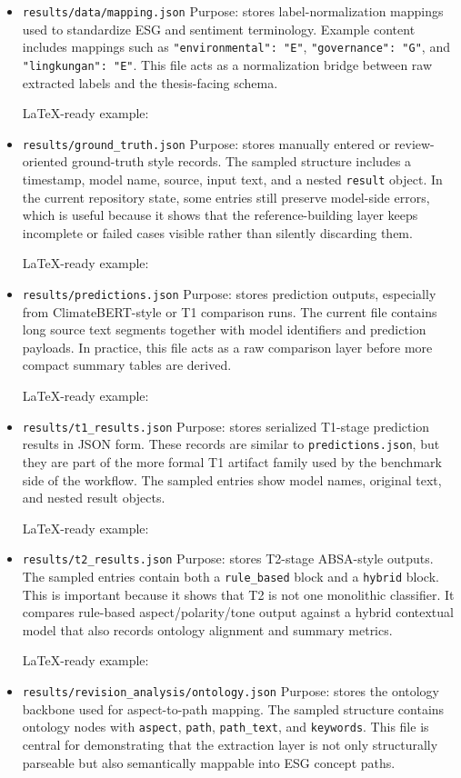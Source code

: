 \begin{itemize}
\item
  \texttt{results/data/mapping.json} Purpose: stores label-normalization mappings used to standardize ESG and sentiment terminology. Example content includes mappings such as \texttt{"environmental":\ "E"}, \texttt{"governance":\ "G"}, and \texttt{"lingkungan":\ "E"}. This file acts as a normalization bridge between raw extracted labels and the thesis-facing schema.

  LaTeX-ready example:
\item
  \texttt{results/ground\_truth.json} Purpose: stores manually entered or review-oriented ground-truth style records. The sampled structure includes a timestamp, model name, source, input text, and a nested \texttt{result} object. In the current repository state, some entries still preserve model-side errors, which is useful because it shows that the reference-building layer keeps incomplete or failed cases visible rather than silently discarding them.

  LaTeX-ready example:
\item
  \texttt{results/predictions.json} Purpose: stores prediction outputs, especially from ClimateBERT-style or T1 comparison runs. The current file contains long source text segments together with model identifiers and prediction payloads. In practice, this file acts as a raw comparison layer before more compact summary tables are derived.

  LaTeX-ready example:
\item
  \texttt{results/t1\_results.json} Purpose: stores serialized T1-stage prediction results in JSON form. These records are similar to \texttt{predictions.json}, but they are part of the more formal T1 artifact family used by the benchmark side of the workflow. The sampled entries show model names, original text, and nested result objects.

  LaTeX-ready example:
\item
  \texttt{results/t2\_results.json} Purpose: stores T2-stage ABSA-style outputs. The sampled entries contain both a \texttt{rule\_based} block and a \texttt{hybrid} block. This is important because it shows that T2 is not one monolithic classifier. It compares rule-based aspect/polarity/tone output against a hybrid contextual model that also records ontology alignment and summary metrics.

  LaTeX-ready example:
\item
  \texttt{results/revision\_analysis/ontology.json} Purpose: stores the ontology backbone used for aspect-to-path mapping. The sampled structure contains ontology nodes with \texttt{aspect}, \texttt{path}, \texttt{path\_text}, and \texttt{keywords}. This file is central for demonstrating that the extraction layer is not only structurally parseable but also semantically mappable into ESG concept paths.


\end{itemize}
